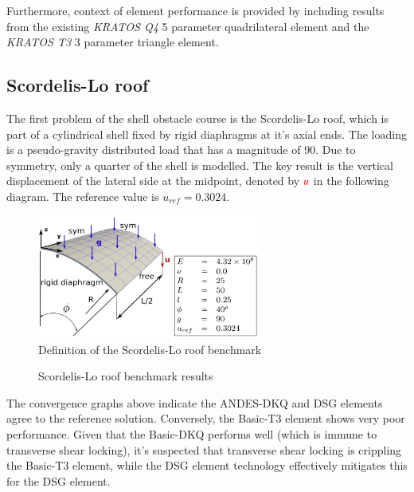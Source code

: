Furthermore, context of element performance is provided by including results from the existing \textit{KRATOS Q4} 5 parameter quadrilateral element and the \textit{KRATOS T3} 3 parameter triangle element.
\newpage
\subsection{Scordelis-Lo roof}
%

The first problem of the shell obstacle course is the Scordelis-Lo roof, which is part of a cylindrical shell fixed by rigid diaphragms at it's axial ends. The loading is a pseudo-gravity distributed load that has a magnitude of 90. Due to symmetry, only a quarter of the shell is modelled. The key result is the vertical displacement of the lateral side at the midpoint, denoted by $\textcolor{red}{u}$ in the following diagram. The reference value is $u_{ref} = 0.3024$.
 
  \begin{figure}[H]
 	\centering
 	\def\svgwidth{\columnwidth}
 	\includegraphics[width=7.3cm]{images/scordelisroof.png}
 	\caption{Definition of the Scordelis-Lo roof benchmark\cite{Bou13}}
 \end{figure}
 
\begin{figure}[H]
	\caption{\label{ref_label_overall}Scordelis-Lo roof benchmark results}
\end{figure}

The convergence graphs above indicate the ANDES-DKQ and DSG elements agree to the reference solution. Conversely, the Basic-T3 element shows very poor performance. Given that the Basic-DKQ performs well (which is immune to transverse shear locking), it's suspected that transverse shear locking is crippling the Basic-T3 element, while the DSG element technology effectively mitigates this for the DSG element. 
\newpage
